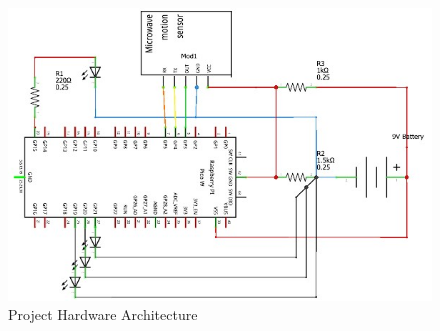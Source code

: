 \begin{figure}[htbp]
    \centering
    \includegraphics[width=\linewidth, angle=-90]{images/hardwareArchitecture}
    \caption{Project Hardware Architecture}
    \label{fig:hardwareArchitecture}
\end{figure}
